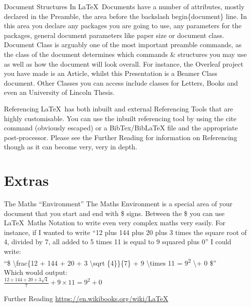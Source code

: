 \documentclass{beamer}
\begin{document}
\begin{frame}{Document Structures}
In \LaTeX~Documents have a number of attributes, mostly declared in the Preamble, the area before the backslash begin\{document\} line. In this area you declare any packages you are going to use, any parameters for the packages, general document parameters like paper size or document class. Document Class is arguably one of the most important preamble commands, as the class of the document determines which commands \& structures you may use as well as how the document will look overall. For instance, the Overleaf project you have made is an Article, whilst this Presentation is a Beamer Class document. Other Classes you can access include classes for Letters, Books and even an University of Lincoln Thesis. 
\end{frame}

\begin{frame}{Referencing}
\LaTeX~has both inbuilt and external Referencing Tools that are highly customisable. You can use the inbuilt referencing tool by using the cite command (obviously escaped) or a BibTex/BibLaTeX file and the appropriate post-processor. Please see the Further Reading for information on Referencing though as it can become very, very in depth.
\end{frame}

\section{Extras}
\begin{frame}{The Maths ``Environment''}
The Maths Environment is a special area of your document that you start and end with \$ signs. Between the \$ you can use \LaTeX~Maths Notation to write even very complex maths very easily. For instance, if I wanted to write ``12 plus 144 plus 20 plus 3 times the square root of 4, divided by 7, all added to 5 times 11 is equal to 9 squared plus 0'' I could write:\\ ``\$ \textbackslash frac\{12 + 144 + 20 + 3 \textbackslash sqrt \{4\}\}\{7\}  + 9 \textbackslash times 11 = 9\textsuperscript{2} \textbackslash + 0 \$''\\
Which would output:\\$\frac{12+144+20+3\sqrt{4}}{7} + 9 \times 11 = 9^2 + 0$
\end{frame}

\begin{frame}{Further Reading}
\url{https://en.wikibooks.org/wiki/LaTeX}
\end{frame}
\end{document}
